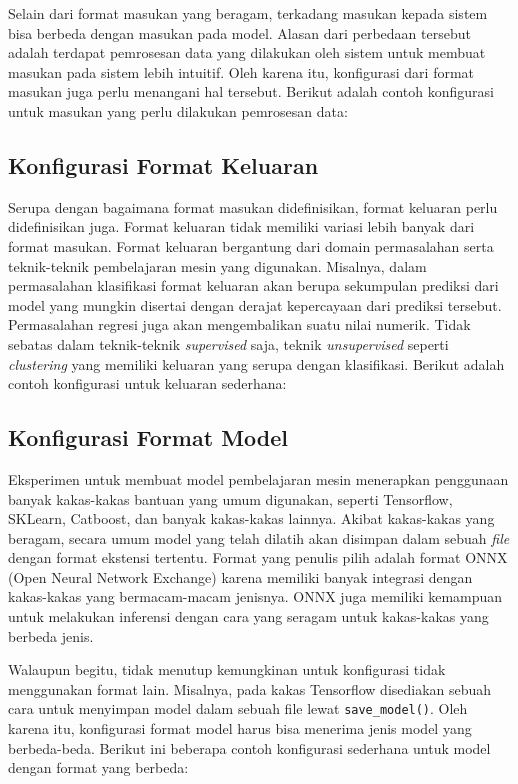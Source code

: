 Selain dari format masukan yang beragam, terkadang masukan kepada sistem bisa berbeda dengan masukan pada model.
Alasan dari perbedaan tersebut adalah terdapat pemrosesan data yang dilakukan oleh sistem untuk membuat masukan pada sistem lebih intuitif.
Oleh karena itu, konfigurasi dari format masukan juga perlu menangani hal tersebut.
Berikut adalah contoh konfigurasi untuk masukan yang perlu dilakukan pemrosesan data:


\subsection{Konfigurasi Format Keluaran}
Serupa dengan bagaimana format masukan didefinisikan, format keluaran perlu didefinisikan juga.
Format keluaran tidak memiliki variasi lebih banyak dari format masukan.
Format keluaran bergantung dari domain permasalahan serta teknik-teknik pembelajaran mesin yang digunakan.
Misalnya, dalam permasalahan klasifikasi format keluaran akan berupa sekumpulan prediksi dari model yang mungkin disertai dengan derajat kepercayaan dari prediksi tersebut.
Permasalahan regresi juga akan mengembalikan suatu nilai numerik.
Tidak sebatas dalam teknik-teknik \textit{supervised} saja, teknik \textit{unsupervised} seperti \textit{clustering} yang memiliki keluaran yang serupa dengan klasifikasi.
Berikut adalah contoh konfigurasi untuk keluaran sederhana:


\subsection{Konfigurasi Format Model}
Eksperimen untuk membuat model pembelajaran mesin menerapkan penggunaan banyak kakas-kakas bantuan yang umum digunakan, seperti Tensorflow, SKLearn, Catboost, dan banyak kakas-kakas lainnya.
Akibat kakas-kakas yang beragam, secara umum model yang telah dilatih akan disimpan dalam sebuah \textit{file} dengan format ekstensi tertentu.
Format yang penulis pilih adalah format ONNX (Open Neural Network Exchange) karena memiliki banyak integrasi dengan kakas-kakas yang bermacam-macam jenisnya.
ONNX juga memiliki kemampuan untuk melakukan inferensi dengan cara yang seragam untuk kakas-kakas yang berbeda jenis.

Walaupun begitu, tidak menutup kemungkinan untuk konfigurasi tidak menggunakan format lain.
Misalnya, pada kakas Tensorflow disediakan sebuah cara untuk menyimpan model dalam sebuah file lewat \texttt{save_model()}.
Oleh karena itu, konfigurasi format model harus bisa menerima jenis model yang berbeda-beda.
Berikut ini beberapa contoh konfigurasi sederhana untuk model dengan format yang berbeda:

